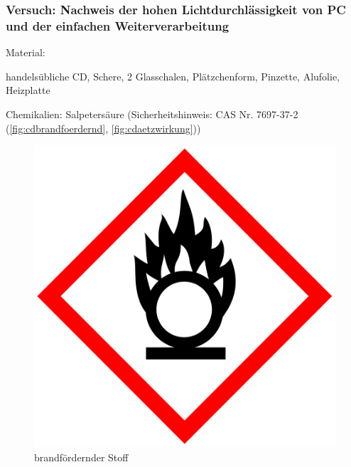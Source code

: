 \subsubsection{Versuch: Nachweis der hohen Lichtdurchlässigkeit von PC und der einfachen Weiterverarbeitung}

Material:
\begin{itemize*}
    \item handelsübliche CD, Schere, 2 Glasschalen, Plätzchenform, Pinzette, Alufolie, Heizplatte
    \item Chemikalien: Salpetersäure (Sicherheitshinweis: CAS Nr. 7697-37-2 (\autoref{fig:cdbrandfoerdernd}, \autoref{fig:cdaetzwirkung}))
\end{itemize*}

\begin{figure}[h]
    \begin{center}
        \begin{minipage}[t]{0.4\textwidth}
            \begin{center}
                \includegraphics[height=0.1\textheight]{Bilder/Optische_Datentraeger_Die_Compact_Disc/Material_Polycarbonat/cdbrandfoerdernd.png}
                \caption[brandfördernder Stoff \newline \url{https://upload.wikimedia.org/wikipedia/commons/e/e5/GHS-pictogram-rondflam.svg} (zuletzt aufgerufen am 19.09.2015)]{brandfördernder Stoff}

\end{center}
\end{minipage}
\end{center}
\end{figure}
